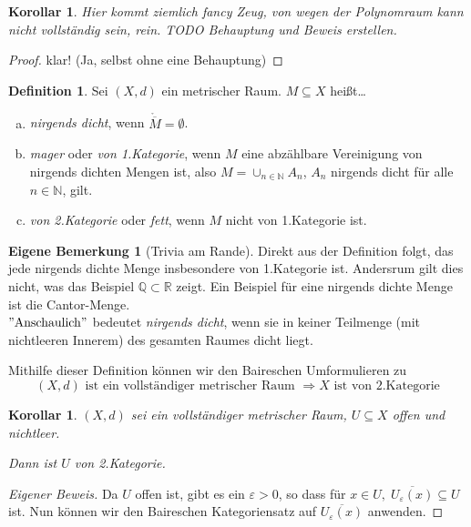 \documentclass[ngerman]{report}
\theoremstyle{plain}%
\newtheorem{cor}[thm]{Korollar}
\newtheorem*{cor*}{Korollar}
\theoremstyle{definition}%
\newtheorem{definition}[thm]{Definition}
\theoremstyle{myStyle}
\newtheorem*{mbem*}{Eigene Bemerkung}
\newcommand{\R}{\mathbb{R}}
\newcommand{\Q}{\mathbb{Q}}
\newcommand{\N}{\mathbb{N}}
\newcommand{\df}[1][]{%
	\overset{#1}{\Rightarrow}
}
\newcommand{\qmarks}[1]{$"\text{#1}"$}
\begin{document}
\begin{cor*}
Hier kommt ziemlich fancy Zeug, von wegen der Polynomraum kann nicht vollständig sein, rein. TODO Behauptung und Beweis erstellen.
\end{cor*}
\begin{proof}
klar! (Ja, selbst ohne eine Behauptung)
\end{proof}

\begin{definition}
	Sei $(X,d)$ ein metrischer Raum. $M\subseteq X$ heißt\dots
	\begin{enumerate}[(a)]
		\item \textit{nirgends dicht}, wenn $\mathring{\overline{M}} = \emptyset$.
		
		\item \textit{mager} oder \textit{von 1.Kategorie}, wenn $M$ eine abzählbare Vereinigung von nirgends dichten Mengen ist, also $M = \cup_{n\in\N} A_n$, $A_n$ nirgends dicht für alle $n\in\N$, gilt.
		
		\item \textit{von 2.Kategorie }oder\textit{ fett}, wenn $M$ nicht von 1.Kategorie ist.
	\end{enumerate}
\end{definition}\par\bigskip

\begin{mbem*}[Trivia am Rande] Direkt aus der Definition folgt, das jede nirgends dichte Menge insbesondere von 1.Kategorie ist. Andersrum gilt dies nicht, was das Beispiel $\Q\subset \R$ zeigt. Ein Beispiel für eine nirgends dichte Menge ist die Cantor-Menge.\\
	 \qmarks{Anschaulich} bedeutet \textit{nirgends dicht}, wenn sie in keiner Teilmenge (mit nichtleeren Innerem) des gesamten Raumes dicht liegt. \par\bigskip
\end{mbem*}
	Mithilfe dieser Definition können wir den Baireschen Umformulieren zu $$(X,d) \text{ ist ein vollständiger metrischer Raum } \df X \text{ ist von 2.Kategorie}$$ 

\begin{cor}
	$(X,d)$ sei ein vollständiger metrischer Raum, $U\subseteq X$ offen und nichtleer.\par
	Dann ist $U$ von 2.Kategorie.
\end{cor} 
\begin{proof}[Eigener Beweis]
	Da $U$ offen ist, gibt es ein $\varepsilon>0$, so dass für $x\in U,\;\overline{U_\varepsilon(x)}\subseteq U$ ist. Nun können wir den Baireschen Kategoriensatz auf $\overline{U_\varepsilon(x)}$ anwenden.
\end{proof}
\end{document}

